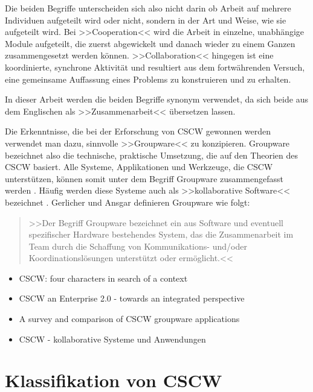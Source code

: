 	\medskip Die beiden Begriffe unterscheiden sich also nicht darin ob Arbeit auf mehrere Individuen aufgeteilt wird oder nicht, sondern in der Art und Weise, wie sie aufgeteilt wird. Bei >>Cooperation<< wird die Arbeit in einzelne, unabhängige Module aufgeteilt, die zuerst abgewickelt und danach wieder zu einem Ganzen zusammengesetzt werden können. >>Collaboration<< hingegen ist eine koordinierte, synchrone Aktivität und resultiert aus dem fortwährenden Versuch, eine gemeinsame Auffassung eines Problems zu konstruieren und zu erhalten.
	
	In dieser Arbeit werden die beiden Begriffe synonym verwendet, da sich beide aus dem Englischen als >>Zusammenarbeit<< übersetzen lassen.
	
	\bigskip Die Erkenntnisse, die bei der Erforschung von CSCW gewonnen werden verwendet man dazu, sinnvolle >>Groupware<< zu konzipieren. Groupware bezeichnet also die technische, praktische Umsetzung, die auf den Theorien des CSCW basiert. Alle Systeme, Applikationen und Werkzeuge, die CSCW unterstützen, können somit unter dem Begriff Groupware zusammengefasst werden \citep{Koch2008, Gerlicher:2007p241}. Häufig werden diese Systeme auch als >>kollaborative Software<< bezeichnet \citep{Bannon:1990p244}. Gerlicher und Ansgar definieren Groupware wie folgt:
	
	\medskip\begin{quote}{>>Der Begriff Groupware bezeichnet ein aus Software und eventuell spezifischer Hardware bestehendes System, das die Zusammenarbeit im Team durch die Schaffung von Kommunikations- und/oder Koordinationslösungen unterstützt oder ermöglicht.<< \citep{Gerlicher:2007p241}}\end{quote}
	
	

\begin{itemize}
	\item {CSCW: four characters in search of a context}
	\item {CSCW an Enterprise 2.0 - towards an integrated perspective}
	\item {A survey and comparison of CSCW groupware applications}
	\item {CSCW - kollaborative Systeme und Anwendungen}
\end{itemize}

\section{Klassifikation von CSCW}


